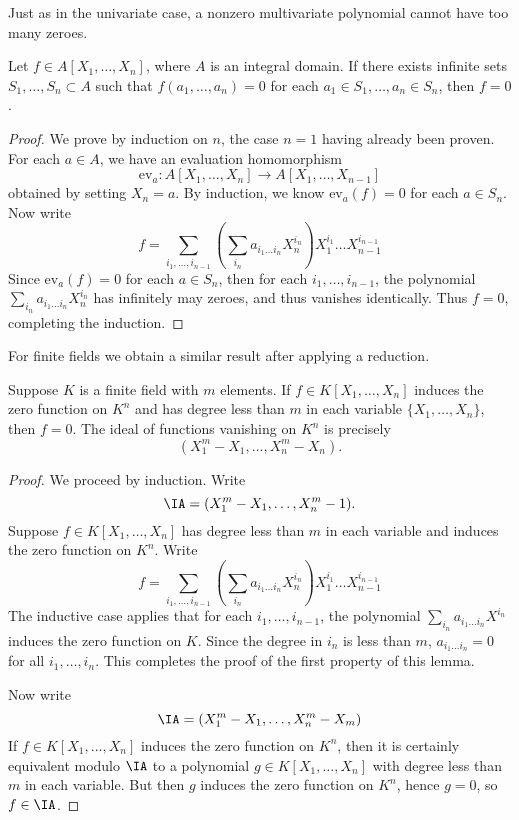 Just as in the univariate case, a nonzero multivariate polynomial cannot have too many zeroes.

\begin{corollary}
    Let $f \in A[X_1, \dots, X_n]$, where $A$ is an integral domain. If there exists infinite sets $S_1, \dots, S_n \subset A$ such that $f(a_1, \dots, a_n) = 0$ for each $a_1 \in S_1, \dots, a_n \in S_n$, then $f = 0$.
\end{corollary}
\begin{proof}
    We prove by induction on $n$, the case $n = 1$ having already been proven. For each $a \in A$, we have an evaluation homomorphism
    \[ \text{ev}_a: A[X_1, \dots, X_n] \to A[X_1, \dots, X_{n-1}] \]
    obtained by setting $X_n = a$. By induction, we know $\text{ev}_a(f) = 0$ for each $a \in S_n$. Now write
    \[ f = \sum_{i_1, \dots, i_{n-1}}  \left( \sum_{i_n} a_{i_1 \dots i_n} X_n^{i_n} \right) X_1^{i_1} \dots X_{n-1}^{i_{n-1}} \]
    Since $\text{ev}_a(f) = 0$ for each $a \in S_n$, then for each $i_1, \dots, i_{n-1}$, the polynomial $\sum_{i_n} a_{i_1 \dots i_n} X_n^{i_n}$ has infinitely may zeroes, and thus vanishes identically. Thus $f = 0$, completing the induction.
\end{proof}

For finite fields we obtain a similar result after applying a reduction.

\begin{lemma}
    Suppose $K$ is a finite field with $m$ elements. If $f \in K[X_1, \dots, X_n]$ induces the zero function on $K^n$ and has degree less than $m$ in each variable $\{ X_1, \dots, X_n \}$, then $f = 0$. The ideal of functions vanishing on $K^n$ is precisely
    \[ (X_1^m - X_1, \dots, X_n^m - X_n). \]
\end{lemma}
\begin{proof}
    We proceed by induction. Write
    \[ \IA = (X_1^m - X_1,\dots, X_n^m - 1). \]
    Suppose $f \in K[X_1, \dots, X_n]$ has degree less than $m$ in each variable and induces the zero function on $K^n$. Write
    \[ f = \sum_{i_1, \dots, i_{n-1}}  \left( \sum_{i_n} a_{i_1 \dots i_n} X_n^{i_n} \right) X_1^{i_1} \dots X_{n-1}^{i_{n-1}} \]
    The inductive case applies that for each $i_1, \dots, i_{n-1}$, the polynomial $\sum_{i_n} a_{i_1 \dots i_n} X^{i_n}$ induces the zero function on $K$. Since the degree in $i_n$ is less than $m$, $a_{i_1 \dots i_n} = 0$ for all $i_1, \dots, i_n$. This completes the proof of the first property of this lemma.

    Now write
    \[ \IA = (X_1^m - X_1, \dots, X_n^m - X_m) \]
    If $f \in K[X_1, \dots, X_n]$ induces the zero function on $K^n$, then it is certainly equivalent modulo $\IA$ to a polynomial $g \in K[X_1, \dots, X_n]$ with degree less than $m$ in each variable. But then $g$ induces the zero function on $K^n$, hence $g = 0$, so $f \in \IA$.
\end{proof}





